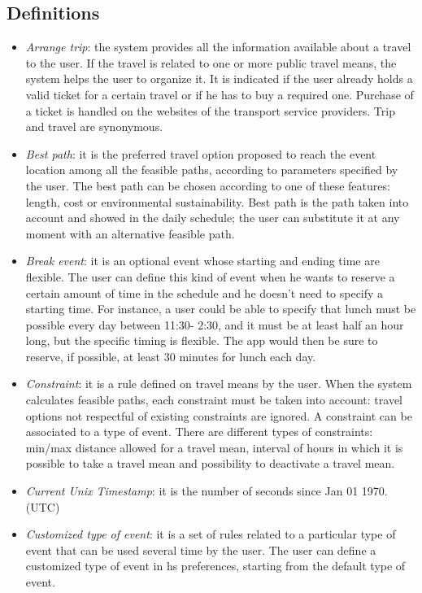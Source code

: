 \subsection{Definitions}
	\begin{itemize}
	\item \textit{Arrange trip}: the system provides all the information available about a travel to the user. If the travel is related to one or more public travel means, the system helps the user to organize it. It is indicated if the user already holds a valid ticket for a certain travel or if he has to buy a required one. Purchase of a ticket is handled on the websites of the transport service providers. Trip and travel are synonymous.
	\item \textit{Best path}: it is the preferred travel option proposed to reach the event location among all the feasible paths, according to parameters specified by the user. The best path can be chosen according to one of these features: length, cost or environmental sustainability. Best path is the path taken into account and showed in the daily schedule; the user can substitute it at any moment with an alternative feasible path. 
	\item \textit{Break event}: it is an optional event whose starting and ending time are flexible. The user can define this kind of event when he wants to reserve a certain amount of time in the schedule and he doesn't need to specify a starting time. For instance, a user could be able to specify that lunch must be possible every day between 11:30-
2:30, and it must be at least half an hour long, but the specific timing is flexible. The app would then be sure to reserve, if possible, at least 30 minutes for lunch each day.
	\item \textit{Constraint}: it is a rule defined on travel means by the user. When the system calculates feasible paths, each constraint must be taken into account: travel options not respectful of existing constraints are ignored. A constraint can be associated to a type of event. 
	\newline
	There are different types of constraints: min/max distance allowed for a travel mean, interval of hours in which it is possible to take a travel mean and possibility to deactivate a travel mean. 
	\item \textit{Current Unix Timestamp}: it is the number of seconds since Jan 01 1970. (UTC)
	\item \textit{Customized type of event}: it is a set of rules related to a particular type of event that can be used several time by the user. The user can define a customized type of event in hs preferences, starting from the default type of event.	

\end{itemize}
